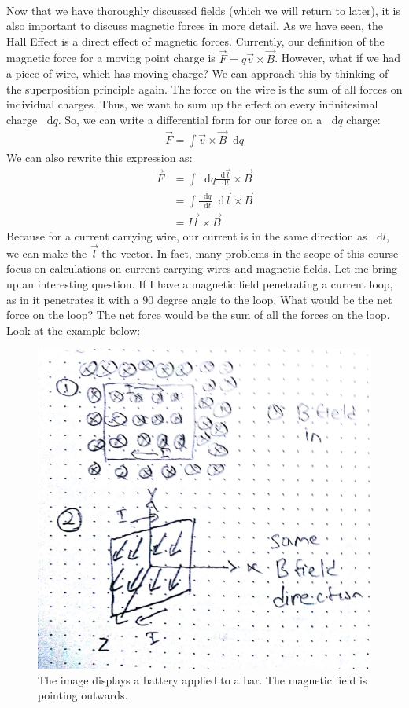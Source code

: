 \documentclass{article}
\newcommand*\dif{\mathop{}\!\mathrm{d}}
\begin{document}
\\
Now that we have thoroughly discussed fields (which we will return to later), it is also important to discuss magnetic forces in more detail. As we have seen, the Hall Effect is a direct effect of magnetic forces. Currently, our definition of the magnetic force for a moving point charge is $\vec{F} = q\vec{v}\times\vec{B}$. However, what if we had a piece of wire, which has moving charge? We can approach this by thinking of the superposition principle again. The force on the wire is the sum of all forces on individual charges. Thus, we want to sum up the effect on every infinitesimal charge $\dif q$. So, we can write a differential form for our force on a $\dif q$ charge: 
\begin{align*}
    \vec{F} = \int \vec{v}\times\vec{B}\dif q
\end{align*}
We can also rewrite this expression as:
\begin{align*}
    \vec{F} &= \int \dif q \frac{\dif \vec{l}}{\dif t} \times \vec{B}\\
    &= \int \frac{\dif q}{\dif t} \dif \vec{l} \times \vec{B}\\
    &= I\vec{l} \times \vec{B}
\end{align*}
Because for a current carrying wire, our current is in the same direction as $\dif l$, we can make the $\vec{l}$ the vector. In fact, many problems in the scope of this course focus on calculations on current carrying wires and magnetic fields. Let me bring up an interesting question. If I have a magnetic field penetrating a current loop, as in it penetrates it with a $90$ degree angle to the loop, What would be the net force on the loop? The net force would be the sum of all the forces on the loop. Look at the example below:
\pagebreak
\begin{figure}[ht]
\center
\includegraphics[width=.3\textwidth]{images/Week3pic4.jpg}
\caption{The image displays a battery applied to a bar. The magnetic field is pointing outwards.}
\end{figure}
\end{document}
